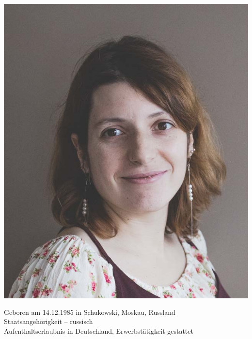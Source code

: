 \documentclass[11pt]{developercv} %
\begin{document}
\begin{minipage}[t]{0.35\textwidth} %
  \vspace{-\baselineskip} %
  \includegraphics[scale=0.13]{Photo.png}
\end{minipage}

\vspace{0.2cm}



{\large{Geboren am 14.12.1985 in Schukowski, Moskau, Russland\\
Staatsangehörigkeit – russisch\\
Aufenthaltserlaubnis in Deutschland, Erwerbstätigkeit gestattet}}
\\\\
\end{document}
